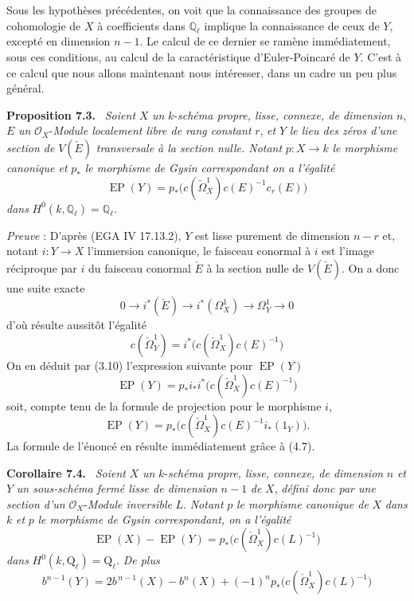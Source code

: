 \documentclass[11pt]{article}
\newenvironment{statement}[1]{\par\medskip\noindent\textbf{#1.}\ }{\par\medskip}
\begin{document}
Sous les hypothèses précédentes, on voit que la connaissance des groupes de cohomologie de $X$ à coefficients dans $\mathbb Q_\ell$ implique la connaissance de ceux de $Y$, excepté en dimension $n-1$. Le calcul de ce dernier se ramène immédiatement, sous ces conditions, au calcul de la caractéristique d'Euler-Poincaré de $Y$. C'est à ce calcul que nous allons maintenant nous intéresser, dans un cadre un peu plus général.

\begin{statement}{Proposition 7.3}
\emph{Soient} $X$ \emph{un} $k$-\emph{schéma propre, lisse, connexe, de dimension} $n$, $E$ \emph{un} $\mathcal O_X$-\emph{Module localement libre de rang constant} $r$, \emph{et} $Y$ \emph{le lieu des zéros d'une section de} $V(\check E)$ \emph{transversale à la section nulle. Notant} $p:X\to k$ \emph{le morphisme canonique et} $p_*$ \emph{le morphisme de Gysin correspondant on a l'égalité}
\[
\operatorname{EP}(Y)=p_*\bigl(c(\check\Omega_X^1)c(E)^{-1}c_r(E)\bigr)
\]
\emph{dans} $H^0(k,\mathbb Q_\ell)=\mathbb Q_\ell$.
\end{statement}

\emph{Preuve} : D'après (EGA IV 17.13.2), $Y$ est lisse purement de dimension $n-r$ et, notant $i:Y\to X$ l'immersion canonique, le faisceau conormal à $i$ est l'image réciproque par $i$ du faisceau conormal $\check E$ à la section nulle de $V(\check E)$. On a donc une suite exacte
\[
0\to i^*(\check E)\to i^*(\Omega_X^1)\to\Omega_Y^1\to0
\tag{7.3.1}
\]
d'où résulte aussitôt l'égalité
\[
c(\check\Omega_Y^1)=i^*\bigl(c(\check\Omega_X^1)c(E)^{-1}\bigr)
\tag{7.3.2}
\]
On en déduit par (3.10) l'expression suivante pour $\operatorname{EP}(Y)$
\[
\operatorname{EP}(Y)=p_*i_*i^*\bigl(c(\check\Omega_X^1)c(E)^{-1}\bigr)
\]
soit, compte tenu de la formule de projection pour le morphisme $i$,
\[
\operatorname{EP}(Y)=p_*\bigl(c(\check\Omega_X^1)c(E)^{-1}i_*(1_Y)\bigr).
\]
La formule de l'énoncé en résulte immédiatement grâce à (4.7).

\begin{statement}{Corollaire 7.4}
\emph{Soient} $X$ \emph{un} $k$-\emph{schéma propre, lisse, connexe, de dimension} $n$ \emph{et} $Y$ \emph{un sous-schéma fermé lisse de dimension} $n-1$ \emph{de} $X$, \emph{défini donc par une section d'un} $\mathcal O_X$-\emph{Module inversible} $L$. \emph{Notant} $p$ \emph{le morphisme canonique de} $X$ \emph{dans} $k$ \emph{et} $p$ \emph{le morphisme de Gysin correspondant, on a l'égalité}
\[
\operatorname{EP}(X)-\operatorname{EP}(Y)=p_*\bigl(c(\check\Omega_X^1)c(L)^{-1}\bigr)
\tag{7.4.1}
\]
\emph{dans} $H^0(k,\mathrm{Q}_\ell)=\mathrm{Q}_\ell$. \emph{De plus}
\[
b^{n-1}(Y)=2b^{\,n-1}(X)-b^n(X)+(-1)^n p_*\bigl(c(\check\Omega_X^1)c(L)^{-1}\bigr)
\tag{7.4.2}
\]
\end{statement}
\end{document}
